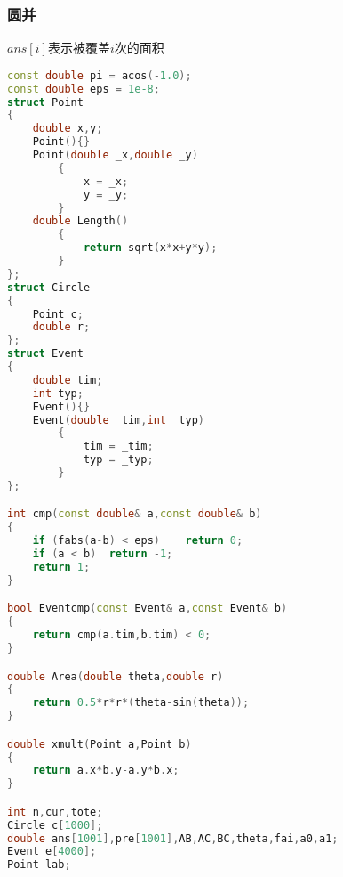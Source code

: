     \subsubsection{圆并}
	$ans[i]$表示被覆盖$i$次的面积
	\begin{lstlisting}[language=c++]
const double pi = acos(-1.0);
const double eps = 1e-8;
struct Point
{
    double x,y;
    Point(){}
    Point(double _x,double _y)
        {
            x = _x;
            y = _y;
        }
    double Length()
        {
            return sqrt(x*x+y*y);
        }
};
struct Circle
{
    Point c;
    double r;
};
struct Event
{
    double tim;
    int typ;
    Event(){}
    Event(double _tim,int _typ)
        {
            tim = _tim;
            typ = _typ;
        }
};

int cmp(const double& a,const double& b)
{
    if (fabs(a-b) < eps)    return 0;
    if (a < b)  return -1;
    return 1;
}

bool Eventcmp(const Event& a,const Event& b)
{
    return cmp(a.tim,b.tim) < 0;
}

double Area(double theta,double r)
{
    return 0.5*r*r*(theta-sin(theta));
}

double xmult(Point a,Point b)
{
    return a.x*b.y-a.y*b.x;
}

int n,cur,tote;
Circle c[1000];
double ans[1001],pre[1001],AB,AC,BC,theta,fai,a0,a1;
Event e[4000];
Point lab;


\end{lstlisting}
